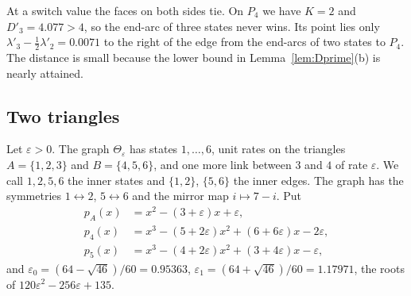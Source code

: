 \documentclass[EJP,preprint]{ejpecp}
\begin{document}
At a switch value the faces on both sides tie. On $P_4$ we have $K=2$ and
$D'_3=4.077>4$, so the end-arc of three states never wins. Its point lies
only $\lambda'_3-\frac12\lambda'_2=0.0071$ to the right of the edge from the
end-arcs of two states to $P_4$. The distance is small because the lower bound
in Lemma~\ref{lem:Dprime}(b) is nearly attained.

\subsection{Two triangles}\label{app:triangles}

Let $\varepsilon>0$. The graph $\Theta_\varepsilon$ has states $1,\dots,6$,
unit rates on the triangles $A=\{1,2,3\}$ and $B=\{4,5,6\}$, and one more link
between $3$ and $4$ of rate $\varepsilon$. We call $1,2,5,6$ the inner states
and $\{1,2\}$, $\{5,6\}$ the inner edges. The graph has the symmetries
$1\leftrightarrow2$, $5\leftrightarrow6$ and the mirror map $i\mapsto7-i$. Put
\begin{align*}
 p_A(x)&=x^2-(3+\varepsilon)x+\varepsilon,\\
 p_4(x)&=x^3-(5+2\varepsilon)x^2+(6+6\varepsilon)x-2\varepsilon,\\
 p_5(x)&=x^3-(4+2\varepsilon)x^2+(3+4\varepsilon)x-\varepsilon,
\end{align*}
and $\varepsilon_0=(64-\sqrt{46})/60=0.95363$,
$\varepsilon_1=(64+\sqrt{46})/60=1.17971$, the roots of
$120\varepsilon^2-256\varepsilon+135$.
\end{document}

